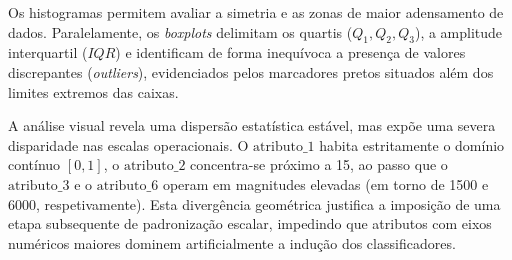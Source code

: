 \documentclass[journal]{IEEEtran}
\begin{document}
Os histogramas permitem avaliar a simetria e as zonas de maior adensamento de dados. Paralelamente, os \textit{boxplots} delimitam os quartis ($Q_1, Q_2, Q_3$), a amplitude interquartil ($IQR$) e identificam de forma inequívoca a presença de valores discrepantes (\textit{outliers}), evidenciados pelos marcadores pretos situados além dos limites extremos das caixas.

A análise visual revela uma dispersão estatística estável, mas expõe uma severa disparidade nas escalas operacionais. O $\text{atributo\_1}$ habita estritamente o domínio contínuo $[0, 1]$, o $\text{atributo\_2}$ concentra-se próximo a 15, ao passo que o $\text{atributo\_3}$ e o $\text{atributo\_6}$ operam em magnitudes elevadas (em torno de 1500 e 6000, respetivamente). Esta divergência geométrica justifica a imposição de uma etapa subsequente de padronização escalar, impedindo que atributos com eixos numéricos maiores dominem artificialmente a indução dos classificadores.
\end{document}
